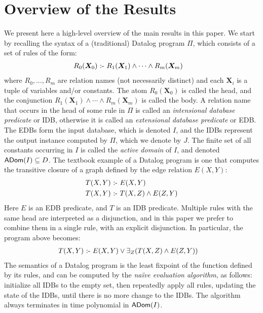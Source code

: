 \section{Overview of the Results}
\label{subsec:overview}

We present here a high-level overview of the main results in this
paper.  We start by recalling the syntax of a (traditional) Datalog
program $\Pi$, which consists of a set of rules of the form:
%
\begin{align}
  R_0(\bm X_0) &\text{ :- } R_1(\bm X_1) \wedge \cdots \wedge R_m(\bm X_m) \label{eq:datalog}
\end{align}
%
where $R_0, \ldots, R_m$ are relation names (not necessarily distinct)
and each $\bm X_i$ is a tuple of variables and/or constants.  The atom
$R_0(\bm X_0)$ is called the head, and the conjunction
$R_1(\bm X_1) \wedge \cdots \wedge R_m(\bm X_m)$ is called the body.
A relation name that occurs in the head of some rule in $\Pi$ is
called an {\em intensional database predicate} or IDB, otherwise it is
called an {\em extensional database predicate} or EDB.  The EDBs form
the input database, which is denoted $I$, and the IDBs represent the
output instance computed by $\Pi$, which we denote by $J$.  The finite
set of all constants occurring in $I$ is called the {\em active
  domain} of $I$, and denoted $\textsf{ADom}(I) \subseteq D$.
%
The textbook example of a Datalog program is one that computes the
transitive closure of a graph defined by the edge relation $E(X,Y)$:
%
\begin{align*}
  T(X,Y) &\text{ :- } E(X,Y) \\
  T(X,Y) &\text{ :- } T(X,Z) \wedge E(Z,Y)
\end{align*}
%
Here $E$ is an EDB predicate, and $T$ is an IDB predicate.  Multiple
rules with the same head are interpreted as a disjunction, and in this
paper we prefer to combine them in a single rule, with an explicit
disjunction.  In particular, the program above becomes:
%
\begin{align}
  T(X,Y) & \text{ :- } E(X,Y) \vee \exists_Z (T(X,Z) \wedge E(Z,Y)) \label{eq:datalog:intro}
\end{align}
%
The semantics of a Datalog program is the least fixpoint of the
function defined by its rules, and can be computed by the {\em na\"ive
  evaluation algorithm}, as follows: initialize all IDBs to the empty
set, then repeatedly apply all rules, updating the state of the IDBs,
until there is no more change to the IDBs.  The algorithm always
terminates in time polynomial in $\textsf{ADom}(I)$.

